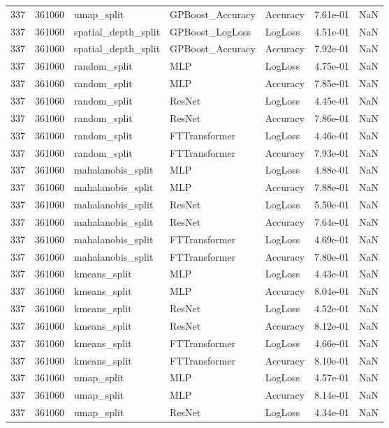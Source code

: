 \begin{tabular}{rrlllrr}
337 & 361060 & umap\_split & GPBoost\_Accuracy & Accuracy & 7.61e-01 & NaN \\
337 & 361060 & spatial\_depth\_split & GPBoost\_LogLoss & LogLoss & 4.51e-01 & NaN \\
337 & 361060 & spatial\_depth\_split & GPBoost\_Accuracy & Accuracy & 7.92e-01 & NaN \\
337 & 361060 & random\_split & MLP & LogLoss & 4.75e-01 & NaN \\
337 & 361060 & random\_split & MLP & Accuracy & 7.85e-01 & NaN \\
337 & 361060 & random\_split & ResNet & LogLoss & 4.45e-01 & NaN \\
337 & 361060 & random\_split & ResNet & Accuracy & 7.86e-01 & NaN \\
337 & 361060 & random\_split & FTTransformer & LogLoss & 4.46e-01 & NaN \\
337 & 361060 & random\_split & FTTransformer & Accuracy & 7.93e-01 & NaN \\
337 & 361060 & mahalanobis\_split & MLP & LogLoss & 4.88e-01 & NaN \\
337 & 361060 & mahalanobis\_split & MLP & Accuracy & 7.88e-01 & NaN \\
337 & 361060 & mahalanobis\_split & ResNet & LogLoss & 5.50e-01 & NaN \\
337 & 361060 & mahalanobis\_split & ResNet & Accuracy & 7.64e-01 & NaN \\
337 & 361060 & mahalanobis\_split & FTTransformer & LogLoss & 4.69e-01 & NaN \\
337 & 361060 & mahalanobis\_split & FTTransformer & Accuracy & 7.80e-01 & NaN \\
337 & 361060 & kmeans\_split & MLP & LogLoss & 4.43e-01 & NaN \\
337 & 361060 & kmeans\_split & MLP & Accuracy & 8.04e-01 & NaN \\
337 & 361060 & kmeans\_split & ResNet & LogLoss & 4.52e-01 & NaN \\
337 & 361060 & kmeans\_split & ResNet & Accuracy & 8.12e-01 & NaN \\
337 & 361060 & kmeans\_split & FTTransformer & LogLoss & 4.66e-01 & NaN \\
337 & 361060 & kmeans\_split & FTTransformer & Accuracy & 8.10e-01 & NaN \\
337 & 361060 & umap\_split & MLP & LogLoss & 4.57e-01 & NaN \\
337 & 361060 & umap\_split & MLP & Accuracy & 8.14e-01 & NaN \\
337 & 361060 & umap\_split & ResNet & LogLoss & 4.34e-01 & NaN \\

\end{tabular}
